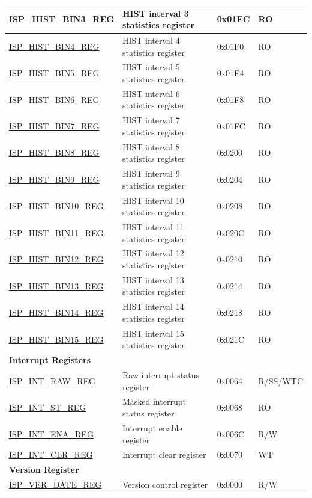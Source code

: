 \begin{longtable}{ | p{6cm} | p{7.2cm} | p{1.3cm} | p{1cm} | }
\hyperref[regdesc:ISPHISTBIN3REG]{ISP\_HIST\_BIN3\_REG} & HIST interval 3 statistics register  & 0x01EC & RO \\ \hline
\hyperref[regdesc:ISPHISTBIN4REG]{ISP\_HIST\_BIN4\_REG} & HIST interval 4 statistics register  & 0x01F0 & RO \\ \hline
\hyperref[regdesc:ISPHISTBIN5REG]{ISP\_HIST\_BIN5\_REG} & HIST interval 5 statistics register  & 0x01F4 & RO \\ \hline
\hyperref[regdesc:ISPHISTBIN6REG]{ISP\_HIST\_BIN6\_REG} & HIST interval 6 statistics register  & 0x01F8 & RO \\ \hline
\hyperref[regdesc:ISPHISTBIN7REG]{ISP\_HIST\_BIN7\_REG} & HIST interval 7 statistics register  & 0x01FC & RO \\ \hline
\hyperref[regdesc:ISPHISTBIN8REG]{ISP\_HIST\_BIN8\_REG} & HIST interval 8 statistics register  & 0x0200 & RO \\ \hline
\hyperref[regdesc:ISPHISTBIN9REG]{ISP\_HIST\_BIN9\_REG} & HIST interval 9 statistics register  & 0x0204 & RO \\ \hline
\hyperref[regdesc:ISPHISTBIN10REG]{ISP\_HIST\_BIN10\_REG} & HIST interval 10 statistics register  & 0x0208 & RO \\ \hline
\hyperref[regdesc:ISPHISTBIN11REG]{ISP\_HIST\_BIN11\_REG} & HIST interval 11 statistics register  & 0x020C & RO \\ \hline
\hyperref[regdesc:ISPHISTBIN12REG]{ISP\_HIST\_BIN12\_REG} & HIST interval 12 statistics register  & 0x0210 & RO \\ \hline
\hyperref[regdesc:ISPHISTBIN13REG]{ISP\_HIST\_BIN13\_REG} & HIST interval 13 statistics register  & 0x0214 & RO \\ \hline
\hyperref[regdesc:ISPHISTBIN14REG]{ISP\_HIST\_BIN14\_REG} & HIST interval 14 statistics register  & 0x0218 & RO \\ \hline
\hyperref[regdesc:ISPHISTBIN15REG]{ISP\_HIST\_BIN15\_REG} & HIST interval 15 statistics register  & 0x021C & RO \\ \hline
\multicolumn{4}{|l|}{\textbf{Interrupt Registers}} \\ \hline
\hyperref[regdesc:ISPINTRAWREG]{ISP\_INT\_RAW\_REG} & Raw interrupt status register & 0x0064 & R/SS/WTC \\ \hline
\hyperref[regdesc:ISPINTSTREG]{ISP\_INT\_ST\_REG} & Masked interrupt status register & 0x0068 & RO \\ \hline
\hyperref[regdesc:ISPINTENAREG]{ISP\_INT\_ENA\_REG} & Interrupt enable register & 0x006C & R/W \\ \hline
\hyperref[regdesc:ISPINTCLRREG]{ISP\_INT\_CLR\_REG} & Interrupt clear register & 0x0070 & WT \\ \hline
\multicolumn{4}{|l|}{\textbf{Version Register}} \\ \hline
\hyperref[regdesc:ISPVERDATEREG]{ISP\_VER\_DATE\_REG} & Version control register & 0x0000 & R/W \\ \hline
\end{longtable}
